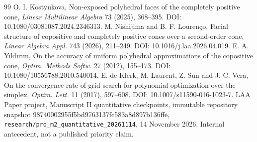 \begin{thebibliography}{99}
 O. I. Kostyukova, Non-exposed polyhedral faces of the completely positive cone, \emph{Linear Multilinear Algebra} 73 (2025), 368--395. DOI: 10.1080/03081087.2024.2346313.
 M. Nishijima and B. F. Louren\c co, Facial structure of copositive and completely positive cones over a second-order cone, \emph{Linear Algebra Appl.} 743 (2026), 211--249. DOI: 10.1016/j.laa.2026.04.019.
 E. A. Y\i ld\i r\i m, On the accuracy of uniform polyhedral approximations of the copositive cone, \emph{Optim. Methods Softw.} 27 (2012), 155--173. DOI: 10.1080/10556788.2010.540014.
 E. de Klerk, M. Laurent, Z. Sun and J. C. Vera, On the convergence rate of grid search for polynomial optimization over the simplex, \emph{Optim. Lett.} 11 (2017), 597--608. DOI: 10.1007/s11590-016-1023-7.
 LAA Paper project, Manuscript II quantitative checkpoints, immutable repository snapshot 98740002955f5bd9763137fc583a8d897b136ffe, \texttt{research/pro\_m2\_quantitative\_20261114}, 14 November 2026. Internal antecedent, not a published priority claim.
\end{thebibliography}

